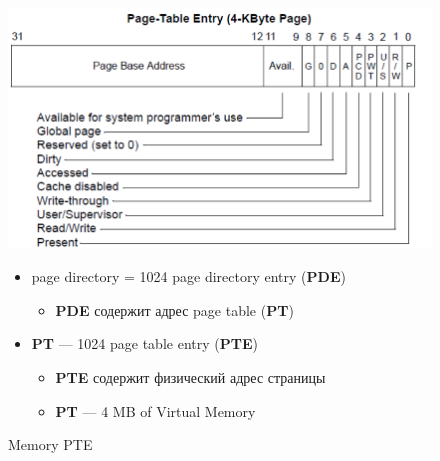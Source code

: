 \documentclass[../../lectures.tex]{subfiles}
\begin{document}
\begin{figure}[H]
\begin{minipage}[c]{0.6\linewidth}
\centering
\includegraphics[width=\textwidth]{images/memory-pte.png}
\caption{Memory PTE}
\end{minipage}
\hspace{0.5cm}
\begin{minipage}[c]{0.4\linewidth}
\begin{itemize}
  \item page directory = 1024 page directory entry (\textbf{PDE})
        \begin{itemize}
            \item \textbf{PDE} содержит адрес page table (\textbf{PT})
        \end{itemize}
  \item \textbf{PT} --- 1024 page table entry (\textbf{PTE})
        \begin{itemize}
            \item \textbf{PTE} содержит физический адрес страницы
            \item \textbf{PT} --- 4 MB of Virtual Memory
        \end{itemize}
\end{itemize}
\end{minipage}
\end{figure}
\end{document}
